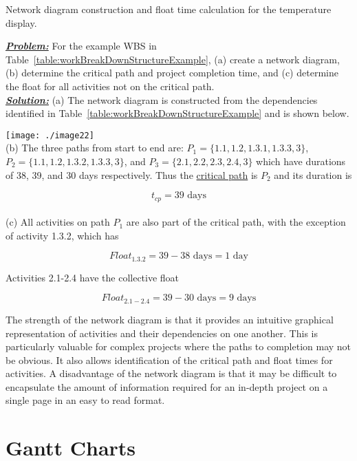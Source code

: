 \begin{example}{Network diagram construction and float time
calculation for the temperature display.}
\label{example:projectManagementNetworkDiagram}

\emph{\textbf{\ul{Problem:}}} For the example WBS in 
Table~\ref{table:workBreakDownStructureExample}, (a)
create a network diagram, (b) determine the critical path and project
completion time, and (c) determine the float for all activities not on
the critical path.\\

\textbf{\ul{\emph{Solution:}}}
(a) The network diagram is constructed from the dependencies identified
in Table~\ref{table:workBreakDownStructureExample} and is shown below.

\texttt{[image: ./image22]} \\

(b) The three paths from start to end are: $P_1 = \{1.1, 1.2, 1.3.1, 1.3.3, 3\}$, \\
$P_2 = \{1.1, 1.2, 1.3.2, 1.3.3, 3\}$, and $P_3 = \{2.1, 2.2, 2.3, 2.4, 3\}$
which have durations of 38, 39, and 30 days respectively. Thus the
\ul{critical path} is $P_2$ and its duration is

$$t_{cp} = 39 \text{ days}$$ \\

(c) All activities on path $P_1$ are also part of
the critical path, with the exception of activity 1.3.2, which has

$$Float_{1.3.2} = 39 - 38 \text{ days} = 1 \text{ day}$$

Activities 2.1-2.4 have the collective float

$$Float_{2.1-2.4} = 39 - 30 \text{ days} = 9 \text{ days}$$
\end{example}

The strength of the network diagram is that it provides an intuitive
graphical representation of activities and their dependencies on one
another. This is particularly valuable for complex projects where the
paths to completion may not be obvious. It also allows identification of
the critical path and float times for activities. A disadvantage of the
network diagram is that it may be difficult to encapsulate the amount of
information required for an in-depth project on a single page in an easy
to read format.

\section{Gantt Charts}
\label{section:gantt-charts}

